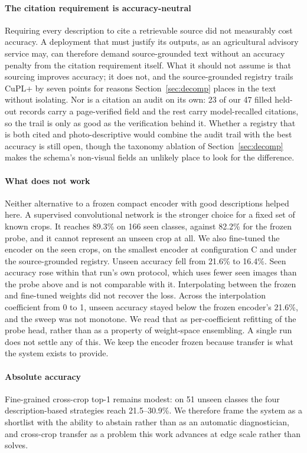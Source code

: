 \documentclass[a4paper,fleqn]{cas-dc}
\begin{document}
\paragraph{The citation requirement is accuracy-neutral} Requiring every description to cite a
retrievable source did not measurably cost accuracy. A deployment that must justify its outputs, as
an agricultural advisory service may, can therefore demand source-grounded text without an accuracy
penalty from the citation requirement itself. What it should not assume is that sourcing improves
accuracy; it does not, and the source-grounded registry trails CuPL+ by seven points for reasons
Section~\ref{sec:decomp} places in the text without isolating. Nor is a citation an audit on its
own: 23 of our 47 filled held-out records carry a page-verified field and the rest carry
model-recalled citations, so the trail is only as good as the verification behind it. Whether a registry that is both cited and photo-descriptive would combine the audit trail with the
best accuracy is still open, though the taxonomy ablation of Section~\ref{sec:decomp} makes the
schema's non-visual fields an unlikely place to look for the difference.

\paragraph{What does not work} Neither alternative to a frozen compact encoder with good
descriptions helped here. A supervised convolutional network is the stronger choice for a fixed set
of known crops. It reaches 89.3\% on 166 seen classes, against 82.2\% for the frozen probe, and it
cannot represent an unseen crop at all. We also fine-tuned the encoder on the seen crops, on the
smallest encoder at configuration C and under the source-grounded registry. Unseen accuracy fell
from 21.6\% to 16.4\%. Seen accuracy rose within that run's own protocol, which uses fewer seen
images than the probe above and is not comparable with it. Interpolating between the frozen and
fine-tuned weights did not recover the loss. Across the interpolation coefficient from 0 to 1,
unseen accuracy stayed below the frozen encoder's 21.6\%, and the sweep was not monotone. We read
that as per-coefficient refitting of the probe head, rather than as a property of weight-space
ensembling. A single run does not settle any of this. We keep the encoder frozen because transfer
is what the system exists to provide.

\paragraph{Absolute accuracy} Fine-grained cross-crop top-1 remains modest: on 51 unseen classes the four
description-based strategies reach 21.5--30.9\%. We therefore frame the system as a shortlist with the ability to abstain rather than as an
automatic diagnostician, and cross-crop transfer as a problem this work advances at edge scale rather
than solves.
\end{document}
